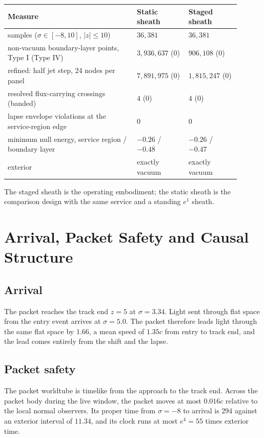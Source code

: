 \documentclass[11pt]{article}
\newcommand{\sig}{\sigma}
\begin{document}
\begin{longtable}{L{0.50\linewidth}L{0.20\linewidth}L{0.20\linewidth}}
\toprule
\textbf{Measure} & \textbf{Static sheath} & \textbf{Staged sheath} \\
\midrule
samples ($\sig\in[-8,10]$, $|z|\le10$) & $36{,}381$ & $36{,}381$ \\
non-vacuum boundary-layer points, Type I (Type IV) & $3{,}936{,}637$ ($0$) & $906{,}108$ ($0$) \\
refined: half jet step, 24 nodes per panel & $7{,}891{,}975$ ($0$) & $1{,}815{,}247$ ($0$) \\
resolved flux-carrying crossings (banded) & $4$ ($0$) & $4$ ($0$) \\
lapse envelope violations at the service-region edge & $0$ & $0$ \\
minimum null energy, service region / boundary layer & $-0.26$ / $-0.48$ & $-0.26$ / $-0.47$ \\
exterior & exactly vacuum & exactly vacuum \\
\bottomrule
\end{longtable}

The staged sheath is the operating embodiment; the static sheath is the comparison design with the same service and a standing $e^{1}$ sheath.

\section{Arrival, Packet Safety and Causal Structure}

\subsection{Arrival}

The packet reaches the track end $z=5$ at $\sig=3.34$. Light sent through flat space from the entry event arrives at $\sig=5.0$. The packet therefore leads light through the same flat space by $1.66$, a mean speed of $1.35c$ from entry to track end, and the lead comes entirely from the shift and the lapse.

\subsection{Packet safety}

The packet worldtube is timelike from the approach to the track end. Across the packet body during the live window, the packet moves at most $0.016c$ relative to the local normal observers. Its proper time from $\sig=-8$ to arrival is $294$ against an exterior interval of $11.34$, and its clock runs at most $e^{4}=55$ times exterior time.
\end{document}
